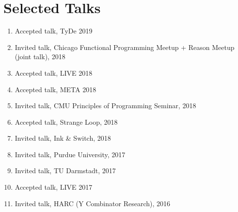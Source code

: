 \documentclass[10pt,letterpaper]{article}
\renewenvironment{itemize}{
  \begin{list}{}{
    \setlength{\leftmargin}{1.25em}
    \setlength{\itemsep}{0.25em}
    \setlength{\parskip}{0pt}
    \setlength{\parsep}{0.2em}
  }
}{
  \end{list}
}
\begin{document}
\section*{Selected Talks}
\begin{enumerate}
  \item Accepted talk, TyDe 2019
  \item Invited talk, Chicago Functional Programming Meetup + Reason Meetup (joint talk), 2018
  \item Accepted talk, LIVE 2018
  \item Accepted talk, META 2018
  \item Invited talk, CMU Principles of Programming Seminar, 2018
  \item Accepted talk, Strange Loop, 2018 
  \item Invited talk, Ink \& Switch, 2018
  \item Invited talk, Purdue University, 2017
  \item Invited talk, TU Darmstadt, 2017
  \item Accepted talk, LIVE 2017
  \item Invited talk, HARC (Y Combinator Research), 2016


\end{enumerate}
\end{document}
